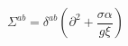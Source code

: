 \begin{equation}
\Sigma ^{ab}=\delta ^{ab}\left( \partial ^{2}+\frac{\sigma \alpha }{g\xi }%
\right)   \label{sab}
\end{equation}

